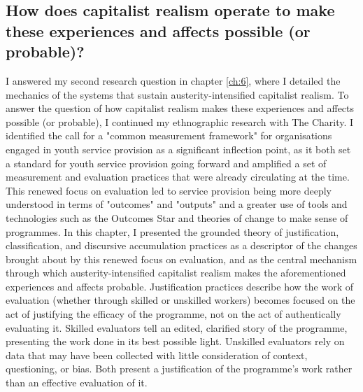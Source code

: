 \subsection{How does capitalist realism operate to make these experiences and affects possible (or probable)?}
\label{subsec:9-2-2}
I answered my second research question in chapter \ref{ch:6}, where I detailed the mechanics of the systems that sustain austerity-intensified capitalist realism. To answer the question of how capitalist realism makes these experiences and affects possible (or probable), I continued my ethnographic research with The Charity. I identified the call for a "common measurement framework" for organisations engaged in youth service provision \citep[p. 4]{house_of_commons_education_committee_services_2011} as a significant inflection point, as it both set a standard for youth service provision going forward and amplified a set of measurement and evaluation practices that were already circulating at the time. This renewed focus on evaluation led to service provision being more deeply understood in terms of "outcomes" and "outputs" and a greater use of tools and technologies such as the Outcomes Star and theories of change to make sense of programmes. In this chapter, I presented the grounded theory of justification, classification, and discursive accumulation practices as a descriptor of the changes brought about by this renewed focus on evaluation, and as the central mechanism through which austerity-intensified capitalist realism makes the aforementioned experiences and affects probable. Justification practices describe how the work of evaluation (whether through skilled or unskilled workers) becomes focused on the act of justifying the efficacy of the programme, not on the act of authentically evaluating it. Skilled evaluators tell an edited, clarified story of the programme, presenting the work done in its best possible light. Unskilled evaluators rely on data that may have been collected with little consideration of context, questioning, or bias. Both present a justification of the programme's work rather than an effective evaluation of it.

